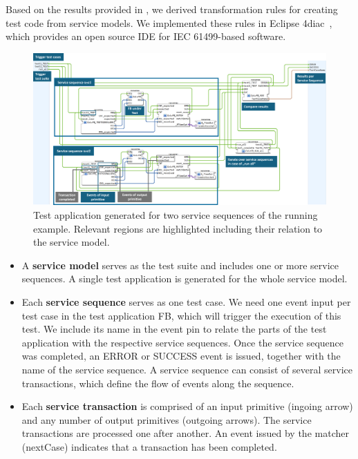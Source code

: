 \begin{bibunit}
Based on the results provided in \cite{Testing_Midhun,biancaMidhunETFAwip}, we derived transformation rules for creating test code from service models. We implemented these rules in Eclipse 4diac~\cite{eclipse4diac}, which provides an open source IDE for IEC 61499-based software.

\begin{figure}[!htbp]
    \centering
    \includegraphics[width=\linewidth]{MX_Papers/Paper10/Figures/generation_rules.png}
    \caption{Test application generated for two service sequences of the running example. Relevant regions are highlighted including their relation to the service model.}
    \label{fig::testapp}
\end{figure}

\begin{itemize}
    \item  A \textbf{service model} serves as the test suite and includes one or more service sequences. A single test application is generated for the whole service model. 
    
    \item Each \textbf{service sequence} serves as one test case. We need one event input per test case in the test application FB, which will trigger the execution of this test. We include its name in the event pin to relate the parts of the test application with the respective service sequences. Once the service sequence was completed, an ERROR or SUCCESS event is issued, together with the name of the service sequence. A service sequence can consist of several service transactions, which define the flow of events along the sequence. 
     
     \item Each \textbf{service transaction} is comprised of an input primitive (ingoing arrow) and any number of output primitives (outgoing arrows). The service transactions are processed one after another. An event issued by the matcher (nextCase) indicates that a transaction has been completed.
    

\end{itemize}
\end{bibunit}
